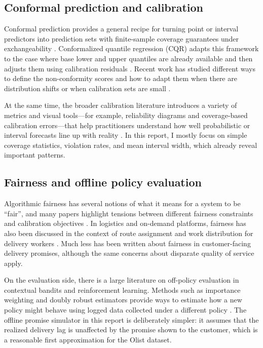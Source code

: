 \documentclass[10pt,twocolumn]{article}
\begin{document}
\subsection{Conformal prediction and calibration}
Conformal prediction provides a general recipe for turning point or interval predictors into prediction sets with finite-sample coverage guarantees under exchangeability \citep{vovk2005algorithmic,angelopoulos2021gentle}. Conformalized quantile regression (CQR) adapts this framework to the case where base lower and upper quantiles are already available and then adjusts them using calibration residuals \citep{romano2019conformalized}. Recent work has studied different ways to define the non-conformity scores and how to adapt them when there are distribution shifts or when calibration sets are small \citep{sousa2024adaptive,zhang2023calibration}.

At the same time, the broader calibration literature introduces a variety of metrics and visual tools---for example, reliability diagrams and coverage-based calibration errors---that help practitioners understand how well probabilistic or interval forecasts line up with reality \citep{guo2017calibration,levi2022uncertainty}. In this report, I mostly focus on simple coverage statistics, violation rates, and mean interval width, which already reveal important patterns.

\subsection{Fairness and offline policy evaluation}
Algorithmic fairness has several notions of what it means for a system to be ``fair'', and many papers highlight tensions between different fairness constraints and calibration objectives \citep{barocas2019fairness,pleiss2017fairness,kleinberg2017impossibility}. In logistics and on-demand platforms, fairness has also been discussed in the context of route assignment and work distribution for delivery workers \citep{gupta2022fairfoody,martinez2024fairrouting}. Much less has been written about fairness in customer-facing delivery promises, although the same concerns about disparate quality of service apply.

On the evaluation side, there is a large literature on off-policy evaluation in contextual bandits and reinforcement learning. Methods such as importance weighting and doubly robust estimators provide ways to estimate how a new policy might behave using logged data collected under a different policy \citep{dudik2011doubly,jiang2016doubly}. The offline promise simulator in this report is deliberately simpler: it assumes that the realized delivery lag is unaffected by the promise shown to the customer, which is a reasonable first approximation for the Olist dataset.
\end{document}
